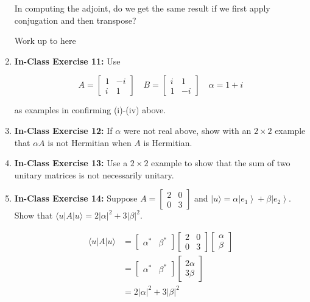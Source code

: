 \documentclass[main.tex]{subfiles}
\begin{document}
\begin{enumerate}
    In computing the adjoint, do we get the same result if we first apply conjugation and then transpose?
    
Work up to here

\item[] \textbf{In-Class Exercise 11:} Use

    $$A=\left[\begin{array}{cc}1 & -i \\ i & 1\end{array}\right] \quad B=\left[\begin{array}{cc}i & 1 \\ 1 & -i\end{array}\right] \quad \alpha=1+i$$
    
    as examples in confirming (i)-(iv) above.

\item[] \textbf{In-Class Exercise 12:} If $\alpha$ were not real above, show with an $2 \times 2$ example that $\alpha A$ is not Hermitian when $A$ is Hermitian.

\item[] \textbf{In-Class Exercise 13:} Use a $2 \times 2$ example to show that the sum of two unitary matrices is not necessarily unitary.

\item[] \textbf{In-Class Exercise 14:} Suppose $A=\left[\begin{array}{ll}2 & 0 \\ 0 & 3\end{array}\right]$ and $|u\rangle=\alpha\left|e_{1}\right\rangle+\beta\left|e_{2}\right\rangle$. Show that $\langle u|A| u\rangle=2|\alpha|^{2}+3|\beta|^{2}$.

        \begin{align*}
            \langle u|A| u\rangle & = \left[\begin{array}{ll} \alpha^* & \beta^* \end{array}\right]  \left[\begin{array}{ll}2 & 0 \\ 0 & 3\end{array}\right] \left[\begin{array}{l} \alpha \\ \beta \end{array}\right]\\
            & = \left[\begin{array}{ll} \alpha^* & \beta^* \end{array}\right] \left[\begin{array}{l} 2 \alpha \\ 3 \beta \end{array}\right]\\
            &=2|\alpha|^{2}+3|\beta|^{2}
        \end{align*}


\end{enumerate}
\end{document}
